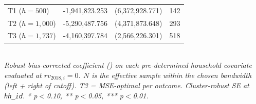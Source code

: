 \begin{table}[t]
\begin{tabular}{lrrr}
T1 ($h=500$) & -1,941,823.253 & (6,372,928.771) & 142 \\
T2 ($h=1,000$) & -5,290,487.756 & (4,371,873.648) & 293 \\
T3 ($h=1,737$) & -4,160,397.784 & (2,566,226.301) & 518 \\
\bottomrule
\end{tabular}
\\
\footnotesize\textit{Robust bias-corrected coefficient (\citealp{CalonicoCattaneoTitiunik2014_rdrobust}) on each pre-determined household covariate evaluated at $rv_{2018,i} = 0$. $N$ is the effective sample within the chosen bandwidth (left + right of cutoff). T3 = MSE-optimal per outcome. Cluster-robust SE at \texttt{hh\_id}. * p$<$0.10, ** p$<$0.05, *** p$<$0.01.}
\end{table}
